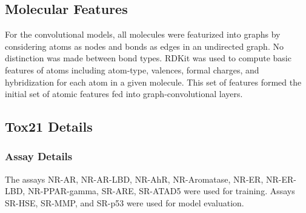 \documentclass[journal=jacsat,manuscript=article]{achemso}
\begin{document}
\subsection{Molecular Features}

For the convolutional models, all molecules were featurized into graphs by considering atoms as nodes and bonds as edges in an undirected graph. No distinction was made between bond types. RDKit \cite{landrum2016} was used to compute basic features of atoms including atom-type, valences, formal charges, and hybridization for each atom in a given molecule. This set  of features formed the initial set of atomic features fed into graph-convolutional layers. 

\subsection{Tox21 Details}

\subsubsection{Assay Details}
The assays NR-AR, NR-AR-LBD, NR-AhR, NR-Aromatase, NR-ER, NR-ER-LBD, NR-PPAR-gamma, SR-ARE, SR-ATAD5 were used for training. Assays SR-HSE, SR-MMP, and SR-p53 were used for model evaluation.
\end{document}
